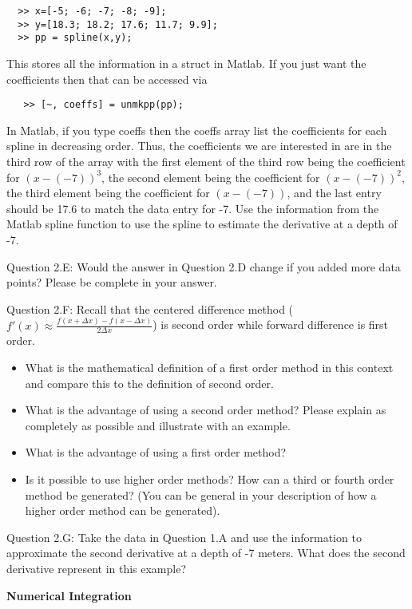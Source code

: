 \documentclass{article}
\def\ds{\displaystyle}
\begin{document}
\begin{verbatim}
  >> x=[-5; -6; -7; -8; -9];
  >> y=[18.3; 18.2; 17.6; 11.7; 9.9];
  >> pp = spline(x,y);
\end{verbatim}
This stores all the information in a struct in Matlab. If you just want the coefficients then that can be accessed via
\begin{verbatim}
   >> [~, coeffs] = unmkpp(pp);
\end{verbatim}
In Matlab, if you type coeffs then the coeffs array list the coefficients for each spline in decreasing order. Thus, the coefficients we are interested in are in the third row of the array with the first element of the third row being the coefficient for $\ds  (x-(-7))^3$, the second element being the coefficient for $\ds  (x-(-7))^2$, the third element  being the coefficient for $\ds  (x-(-7))$, and the last entry should be 17.6 to match the data entry for -7. Use the information from the Matlab spline function to use the spline to estimate the derivative at a depth of -7. 
\medskip \par \noindent
%
Question 2.E: Would the answer in Question 2.D change if you added more data points?  Please be complete in your answer.   
\medskip \par \noindent
%
Question 2.F: Recall that the centered difference method ($\ds f'(x) \approx \frac {f(x+\Delta x) - f(x-\Delta x)}{2\Delta x}$) is second order while forward difference is first order. 
\begin{itemize}
    \item What is the mathematical definition of a first order method in this context and compare this to the definition of second order. 
    \item What is the advantage of using a second order method? Please explain as completely as possible and illustrate with an example. 
    \item What is the advantage of using a first order method? 
    \item Is it possible to use higher order methods?  How can a third or fourth order method be generated? (You can be general in your description of how a higher order method can be generated). 
\end{itemize}
\medskip \par \noindent
%
Question 2.G: Take the data in Question 1.A and use the information to approximate the second derivative at a depth of -7 meters. What does the second derivative represent in this example? 
%
\par \bigskip \par
{\bf Numerical Integration } \\  \par \medskip \noindent
\end{document}
